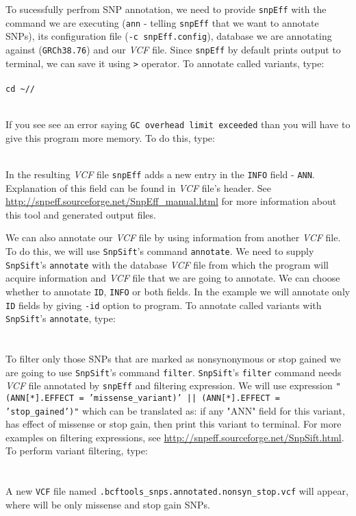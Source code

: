 To sucessfully perfrom SNP
annotation, we need to provide \texttt{snpEff} with the command we are executing 
(\texttt{ann} - telling \texttt{snpEff} that we want to annotate SNPs), its configuration file (\texttt{-c snpEff.config}),
database we are annotating against (\texttt{GRCh38.76}) and our \textit{VCF} file. Since \texttt{snpEff} by default prints
output to terminal, we can save it using \texttt{>} operator.
To annotate called variants, type:\\~\\
\texttt{cd \textasciitilde/\workDir/\reseqDir}\\
\\

\begin{framed}
If you see see an error saying \texttt{GC overhead limit exceeded} than you will have to give this
program more memory. To do this, type:\\~\\
\end{framed}
In the resulting \textit{VCF} file \texttt{snpEff} adds a new entry in the \texttt{INFO} field - \texttt{ANN}.
Explanation of this field can be found in \textit{VCF} file's header. See \url{http://snpeff.sourceforge.net/SnpEff_manual.html}
for more information about this tool and generated output files.

We can also annotate our \textit{VCF} file by using information from another \textit{VCF} file.
To do this, we will use \texttt{SnpSift}'s command \texttt{annotate}. 
We need to supply \texttt{SnpSift}'s \texttt{annotate} with the database \textit{VCF} file from which
the program will acquire information and \textit{VCF} file that we are going to annotate. We can
choose whether to annotate \texttt{ID}, \texttt{INFO} or both fields. In the example we will
annotate only \texttt{ID} fields by giving \texttt{-id} option to program.
To annotate called variants with \texttt{SnpSift}'s \texttt{annotate}, type:\\~\\
\\


To filter only those SNPs that are marked as nonsynonymous or stop gained we are going to
use \texttt{SnpSift}'s command \texttt{filter}. \texttt{SnpSift}'s \texttt{filter} command needs
\textit{VCF} file annotated by \texttt{snpEff} and filtering expression.
We will use expression \texttt{"(ANN[*].EFFECT = 'missense\_variant)' || (ANN[*].EFFECT = 'stop\_gained')"}
which can be translated as: if any "ANN" field for this variant, has effect of missense or stop gain, then print this variant
to terminal. For more examples on filtering expressions, see \url{http://snpeff.sourceforge.net/SnpSift.html}.
To perform variant filtering, type:\\~\\
\\

A new \texttt{VCF} file named \texttt{\mapReads.bcftools\_snps.annotated.nonsyn\_stop.vcf} will appear, where will be
only missense and stop gain SNPs.

